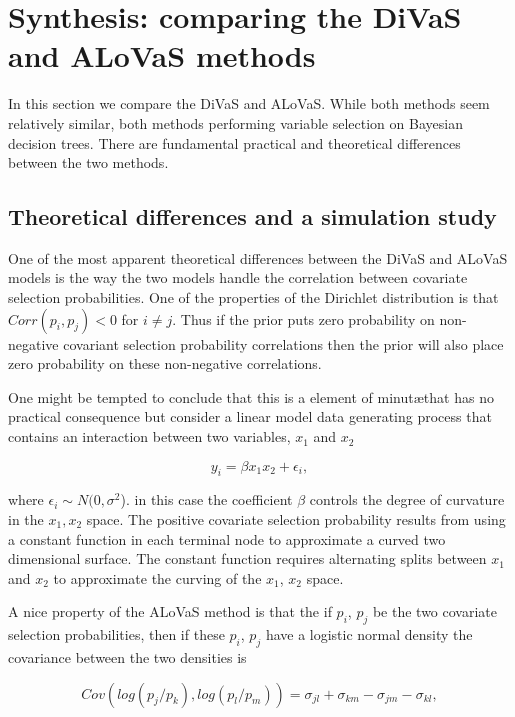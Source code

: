 \section{Synthesis: comparing the DiVaS and ALoVaS methods}
In this section we compare the DiVaS and ALoVaS. While both methods seem relatively similar, both methods performing variable selection on Bayesian decision trees. There are fundamental practical and theoretical differences between the two methods. 

\subsection{Theoretical differences and a simulation study}

One of the most apparent theoretical differences between the DiVaS and ALoVaS models is the way the two models handle the correlation between covariate selection probabilities. One of the properties of the Dirichlet distribution is that $Corr(p_i,p_j) < 0$ for $i\neq j$. Thus if the prior puts zero probability on non-negative covariant selection probability correlations then the prior will also place zero probability on these non-negative correlations. 

One might be tempted to conclude that this is a element of minut\ae that has no practical consequence but consider a linear model data generating process that contains an interaction between two variables, $x_1$ and $x_2$

\begin{equation}\label{eqn:interaction_model}
y_i = \beta x_1x_2 + \epsilon_i,
\end{equation}  

where $\epsilon_i \sim N(0, \sigma^2$). in this case the coefficient $\beta$ controls the degree of curvature in the $x_1, x_2$ space. The positive covariate selection probability results from using a constant function in each terminal node to approximate a curved two dimensional surface. The constant function requires alternating splits between $x_1$ and $x_2$ to approximate the curving of the $x_1$, $x_2$ space. 

A nice property of the ALoVaS method is that the if $p_i$, $p_j$ be the two covariate selection probabilities, then if these $p_i$, $p_j$ have a logistic normal density the covariance between the two densities is 

\begin{equation}\label{eqn:cov_aln}
Cov(log(p_j / p_k), log(p_l / p_m) ) = \sigma_{jl} + \sigma_{km} - \sigma_{jm} - \sigma_{kl},
\end{equation}

